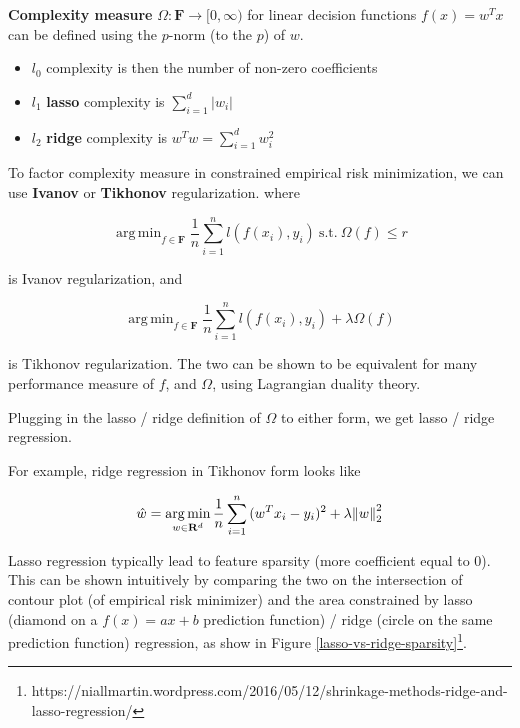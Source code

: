 \documentclass{article}
\DeclareMathOperator*{\argmin}{arg\,min}
\begin{document}
\textbf{Complexity measure} $\Omega : \mathbf{F} \to [0, \infty)$ for linear decision functions $f(x) = w^{T} x$ can be defined using the $p$-norm (to the $p$) of $w$.

\begin{itemize}
  \item $\mathit{l}_0$ complexity is then the number of non-zero coefficients
  \item $\mathit{l}_1$ \textbf{lasso} complexity is $\sum_{i = 1}^{d}{|w_i|}$
  \item $\mathit{l}_2$ \textbf{ridge} complexity is $w^{T} w = \sum_{i = 1}^{d}{w_{i}^{2}}$
\end{itemize}

To factor complexity measure in constrained empirical risk minimization, we can use \textbf{Ivanov} or \textbf{Tikhonov} regularization. where

$$
\argmin_{f \in \mathbf{F}}{\frac{1}{n} \sum_{i = 1}^{n}{\mathit{l}(f(x_i), y_i)}} ~ \text{s.t.} ~ \Omega(f) \leq r
$$

is Ivanov regularization, and

$$
\argmin_{f \in \mathbf{F}}{\frac{1}{n} \sum_{i = 1}^{n}{\mathit{l}(f(x_i), y_i)} + \lambda \Omega(f)}
$$

is Tikhonov regularization.
The two can be shown to be equivalent for many performance measure of $f$, and $\Omega$, using Lagrangian duality theory.

Plugging in the lasso / ridge definition of $\Omega$ to either form, we get lasso / ridge regression.

For example, ridge regression in Tikhonov form looks like

$$
\hat{w} = \argmin_{w \in \mathbf{R}^{d}}{\frac{1}{n} \sum_{i = 1}^{n}{(w^{T} x_i - y_i)^2} + \lambda \norm{w}_2^2}
$$

Lasso regression typically lead to feature sparsity (more coefficient equal to $0$).
This can be shown intuitively by comparing the two on the intersection of contour plot (of empirical risk minimizer) and the area constrained by lasso (diamond on a $f(x) = ax + b$ prediction function) / ridge (circle on the same prediction function) regression, as show in Figure \ref{lasso-vs-ridge-sparsity}\footnote{https://niallmartin.wordpress.com/2016/05/12/shrinkage-methods-ridge-and-lasso-regression/}.
\end{document}
